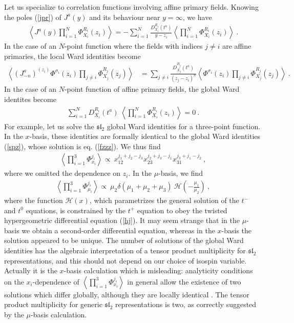 \documentclass[12pt,a4paper,notitlepage]{report}
\newcommand \la {\left\langle}
\newcommand \ra {\right\rangle}
\numberwithin{equation}{section}
\theoremstyle{break}
\begin{document}
Let us specialize to correlation functions involving affine primary fields. Knowing the poles (\ref{jpr}) of $J^a(y)$ and its behaviour near $y=\infty$, we have
\begin{align}
 \la J^a(y) \prod_{i=1}^N \Phi^{R_i}_{X_i}(z_i)\ra = - \sum_{i=1}^N \frac{D^{R_i}_{X_i}(t^a)}{y-z_i}\la \prod_{i=1}^N \Phi^{R_i}_{X_i}(z_i)\ra\ .
\label{dja}
\end{align}
In the case of an $N$-point function where the fields with indices $j\neq i$ are affine primaries, the local Ward identities become
\begin{align}
\la\left(J^a_{-n}\right)^{(z_i)}\Phi^{\sigma_i}(z_i)\prod_{j\neq i} \Phi^{R_j}_{X_j}(z_j)\ra &=\sum_{j\neq i} \frac{D_{X_j}^{R_j}(t^a)}{(z_j-z_i)^n} \la \Phi^{\sigma_i}(z_i)\prod_{j\neq i} \Phi^{R_j}_{X_j}(z_j)\ra\ . 
\label{jmnz}
\end{align}
In the case of an $N$-point function of affine primary fields, the global Ward identites become
\begin{align}
 \sum_{i=1}^N D_{X_i}^{R_i}(t^a)\ \la \prod_{i=1}^N \Phi^{R_i}_{X_i}(z_i)\ra   = 0 \ .
\label{drxt}
\end{align}
For example, let us solve the $\mathfrak{sl}_2$ global Ward identities for a three-point function. In the $x$-basis, these identities are formally identical to the global Ward identities (\ref{spz}), whose solution is eq. (\ref{fzzz}). We thus find
\begin{align}
 \la \prod_{i=1}^3 \Phi^{j_i}_{x_i} \ra \propto\ x_{12}^{j_1+j_2-j_3} x_{23}^{j_2+j_3-j_1} x_{31}^{j_3+j_1-j_2}\ ,
\label{xxx}
\end{align}
where we omitted the dependence on $z_i$. In the $\mu$-basis, we find 
\begin{align}
 \la \prod_{i=1}^3\Phi^{j_i}_{\mu_i}\ra \propto\ \mu_2\delta(\mu_1+\mu_2+\mu_3)\ \mathcal{H}\left(-\frac{\mu_1}{\mu_2}\right)\ ,
\label{pmf}
\end{align}
where the function $\mathcal{H}(x)$, which parametrizes the general solution of the $t^-$ and $t^0$ equations, is constrained by the $t^+$ equation to obey the twisted hypergeometric differential equation (\ref{hj}).
It may seem strange that in the $\mu$-basis we obtain a second-order differential equation, whereas in the $x$-basis the solution appeared to be unique. The number of solutions of the global Ward identities has the algebraic interpretation of a tensor product multiplicity for $\mathfrak{sl}_2$ representations, and this should not depend on our choice of isospin variable. Actually it is the $x$-basis calculation which is misleading: analyticity conditions on the $x_i$-dependence of $\la \prod_{i=1}^3 \Phi^{j_i}_{x_i} \ra$ in general allow the existence of two solutions which differ globally, although they are locally identical \cite{rib09}. The tensor product multiplicity for generic $\mathfrak{sl}_2$ representations is two, as correctly suggested by the $\mu$-basis calculation. 
\end{document}
